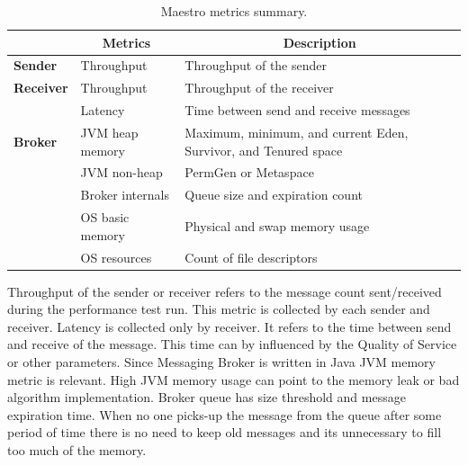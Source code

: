 \begin{table}[H]
\centering
\begin{tabular}{|p{2.5cm}|p{3.5cm}|p{7cm}|}
\hline
\rowcolor[HTML]{C5E3DF}
\multicolumn{1}{|c|}{\textbf{Component}} & \multicolumn{1}{c|}{\textbf{Metrics}} & \multicolumn{1}{c|}{\textbf{Description}}                       \\ \hline
\textbf{Sender}                          & Throughput                            & Throughput of the sender                                        \\ \hline
\textbf{Receiver}                        & Throughput                            & Throughput of the receiver                                      \\ \hline
\textbf{}                                & Latency                               & Time between send and receive messages                           \\ \hline
\textbf{Broker}			                & JVM heap memory                       & Maximum, minimum, and current Eden, Survivor, and Tenured space \\ \hline
                                         & JVM non-heap                          & PermGen or Metaspace\footnotemark{}                                            \\ \hline
                                         & Broker internals                      & Queue size and expiration count                                 \\ \hline
                                         & OS basic memory                       & Physical and swap memory usage                                  \\ \hline
                                         & OS resources                          & Count of file descriptors                                       \\ \hline
\end{tabular}
\caption{Maestro metrics summary.}
\label{tab:maestro_metrics}
\end{table}


Throughput of the sender or receiver refers to the message count sent/received during the performance test run. This metric is collected by each sender and receiver. Latency is collected only by receiver. It refers to the time between send and receive of the message. This time can by influenced by the  Quality of Service or other parameters. Since Messaging Broker is written in Java JVM memory metric is relevant. High JVM memory usage can point to the memory leak or bad algorithm implementation. Broker queue has size threshold and message expiration time. When no one picks-up the message from the queue after some period of time there is no need to keep old messages and its unnecessary to fill too much of the memory.

